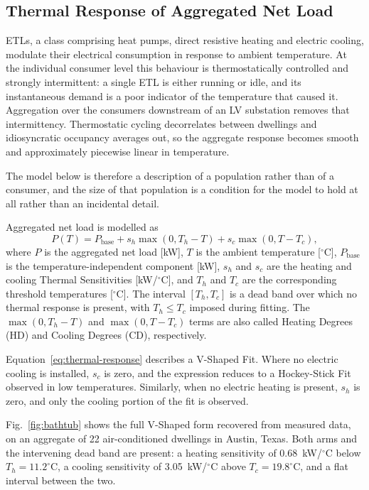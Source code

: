 \documentclass[9pt,journal,a4]{IEEEtran}
\begin{document}
\subsection{Thermal Response of Aggregated Net Load}

ETLs, a class comprising heat pumps, direct resistive heating and electric cooling, modulate their electrical consumption in response to ambient temperature. At the individual consumer level this behaviour is thermostatically controlled and strongly intermittent: a single ETL is either running or idle, and its instantaneous demand is a poor indicator of the temperature that caused it. Aggregation over the consumers downstream of an LV substation removes that intermittency. Thermostatic cycling decorrelates between dwellings and idiosyncratic occupancy averages out, so the aggregate response becomes smooth and approximately piecewise linear in temperature.

The model below is therefore a description of a population rather than of a consumer, and the size of that population is a condition for the model to hold at all rather than an incidental detail.

Aggregated net load is modelled as
\begin{equation}
P(T)
=
P_{\mathrm{base}}
+
s_h \max\left(0,T_h-T\right)
+
s_c \max\left(0,T-T_c\right),
\label{eq:thermal-response}
\end{equation}
where $P$ is the aggregated net load [kW], $T$ is the ambient temperature [$^\circ$C], $P_{\mathrm{base}}$ is the temperature-independent component [kW], $s_h$ and $s_c$ are the heating and cooling Thermal Sensitivities [kW/$^\circ$C], and $T_h$ and $T_c$ are the corresponding threshold temperatures [$^\circ$C]. The interval $[T_h,T_c]$ is a dead band over which no thermal response is present, with $T_h \leq T_c$ imposed during fitting. The $\max\left(0,T_h-T\right)$ and $\max\left(0,T-T_c\right)$ terms are also called Heating Degrees (HD) and Cooling Degrees (CD), respectively.

Equation~\eqref{eq:thermal-response} describes a V-Shaped Fit. Where no electric cooling is installed, $s_c$ is zero, and the expression reduces to a Hockey-Stick Fit observed in low temperatures. Similarly, when no electric heating is present, $s_h$ is zero, and only the cooling portion of the fit is observed.

Fig.~\ref{fig:bathtub} shows the full V-Shaped form recovered from measured data, on an aggregate of 22 air-conditioned dwellings in Austin, Texas. Both arms and the intervening dead band are present: a heating sensitivity of 0.68~kW/$^\circ$C below $T_h = 11.2^\circ$C, a cooling sensitivity of 3.05~kW/$^\circ$C above $T_c = 19.8^\circ$C, and a flat interval between the two.
\end{document}
